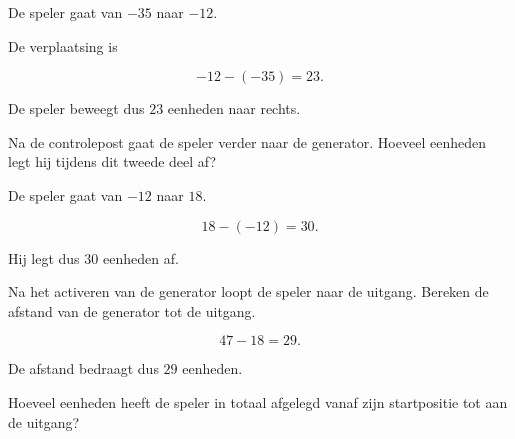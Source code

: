 \documentclass{ximera}
\begin{document}
\begin{oefening}[De metrotunnel]{\oefG\ESS}
\begin{question}
        \begin{oplossing}
        
        De speler gaat van \(-35\) naar \(-12\).
        
        De verplaatsing is
        
        \[
        -12-(-35)=23.
        \]
        
        De speler beweegt dus \(23\) eenheden naar rechts.
        
        \end{oplossing}
        
        \end{question}
        
        
        \begin{question}
        
        Na de controlepost gaat de speler verder naar de generator.
        Hoeveel eenheden legt hij tijdens dit tweede deel af?
        
        \begin{oplossing}
        
        De speler gaat van \(-12\) naar \(18\).
        
        \[
        18-(-12)=30.
        \]
        
        Hij legt dus \(30\) eenheden af.
        
        \end{oplossing}
        
        \end{question}
        
        
        \begin{question}
        
        Na het activeren van de generator loopt de speler naar de uitgang.
        Bereken de afstand van de generator tot de uitgang.
        
        \begin{oplossing}
        
        \[
        47-18=29.
        \]
        
        De afstand bedraagt dus \(29\) eenheden.
        
        \end{oplossing}
        
        \end{question}
        
        
        \begin{question}
        
        Hoeveel eenheden heeft de speler in totaal afgelegd vanaf zijn
        startpositie tot aan de uitgang?
        

\end{question}
\end{oefening}
\end{document}
